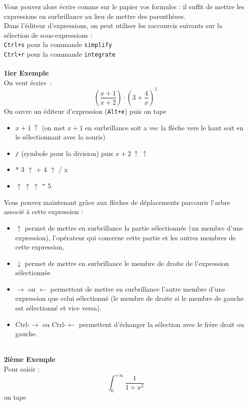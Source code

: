 \documentclass[a4paper,11pt]{article}
\begin{document}
Vous pouvez alors \'ecrire comme sur le papier vos formules : il suffit de 
mettre les expressions en surbrillance au lieu de mettre des
parenth\`eses.\\
Dans l'\'editeur d'expressions, on peut utiliser les raccourcis suivants sur la
s\'election de sous-expressions :\\
{\tt Ctrl+s} pour la commande {\tt simplify}\\
{\tt Ctrl+r} pour la commande {\tt integrate}\\
\
\ \\
{\bf 1ier Exemple}\\
On veut \'ecrire~:
\[ \left(\frac{x+1}{x+2}\right) \cdot \left(3+\frac{4}{x} \right)^5 \]
On ouvre un \'editeur d'expression ({\tt Alt+e})
puis on tape
\begin{itemize}
\item $x+1 \ \uparrow$ (on met $x+1$ en surbrillance soit a
vec la fl\`eche vers le haut soit en le s\'electionnant avec la souris)
\item \verb|/| (symbole pour la division) puis $x+2 \ \uparrow \ \uparrow$ 
\item
* 3 $\uparrow$ + 4 $\uparrow$ / x
\item
$\uparrow \ \uparrow \ \uparrow$ \verb|^| 5
\end{itemize}
Vous pouvez maintenant gr\^ace aux fl\`eches de d\'eplacements parcourir 
l'arbre associ\'e \`a cette expression :
\begin{itemize}
\item 
$\uparrow$ permet de mettre en surbrillance la partie s\'electionn\'ee (un 
membre d'une expression), l'op\'erateur qui concerne cette 
partie et les autres membres de cette expression,
\item
$\downarrow$ permet de mettre en surbrillance le membre de droite de 
 l'expression s\'electionn\'ee
\item
$\rightarrow$ ou $\leftarrow$ permettent de mettre en surbrillance l'autre 
membre d'une expression que celui s\'electionn\'e
(le membre de droite si le membre de gauche est s\'electionn\'e et
vice versa).
\item Ctrl-$\rightarrow$ ou Ctrl-$\leftarrow$ permettent d'\'echanger
la s\'election avec le fr\`ere droit ou gauche.
\end{itemize}
\ \\
{\bf 2i\`eme Exemple}\\
Pour saisir :
\[ \int_0^{+\infty} \frac{1}{1+x^2} \]
on tape
\end{document}

